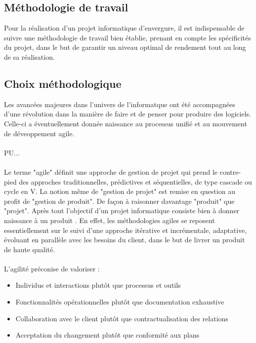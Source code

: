 \begin{spacing}{1.5}
\section{Méthodologie de travail}
Pour la réalisation d'un projet informatique d'envergure, il est indispensable de suivre une méthodologie de travail bien établie, prenant en compte les spécificités du projet, dans le but de garantir un niveau optimal de rendement tout au long de sa réalisation.
\subsection{Choix méthodologique}
Les avancées majeures dans l'univers de l'informatque ont été accompagnées d'une révolution dans la manière de faire et de penser pour produire des logiciels. Celle-ci a éventuellement donnée naissance au processus unifié et au mouvement de déveoppement agile.\\
\\
PU...\\
\\
 Le terme "agile" définit une approche de gestion de projet qui prend le contre-pied des approches traditionnelles, prédictives et séquentielles, de type cascade ou cycle en V. La notion même de "gestion de projet" est remise en question au profit de "gestion de produit". De façon à raisonner davantage "produit" que "projet". Après tout l'objectif d'un projet informatique consiste bien à donner naissance à un produit \cite{http://www.agiliste.fr/introduction-methodes-agiles/}. En effet, les méthodologies agiles se reposent essentiellement sur le suivi d'une approche itérative et incrémentale, adaptative, évoluant en parallèle avec les besoins du client, dans le but de livrer un produit de haute qualité.\\
\\
L'agilité préconise de valoriser :
\begin{itemize}
    \item Individus et interactions plutôt que processus et outils
    \item Fonctionnalités opérationnelles plutôt que documentation exhaustive
    \item Collaboration avec le client plutôt que contractualisation des relations
    \item Acceptation du changement plutôt que conformité aux plans
\end{itemize}

\end{spacing}
